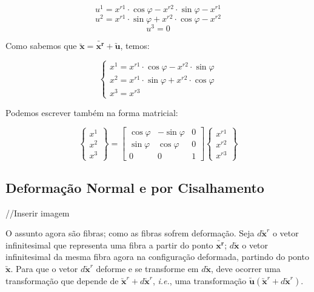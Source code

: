 \begin{enumerate}[a)]
			\[u^1=x^{r1}\cdot\cos\varphi-x^{r2}\cdot\sin\varphi-x^{r1}\]
			\[u^2=x^{r1}\cdot\sin\varphi+x^{r2}\cdot\cos\varphi-x^{r2}\]
			\[u^3=0\]
			
			Como sabemos que $\utilde{\mathbf{x}}=\utilde{\mathbf{x^r}}+\utilde{\mathbf{u}}$, temos:
			
			\[
				\begin{cases}
					x^1=x^{r1}\cdot\cos\varphi-x^{r2}\cdot\sin\varphi \\ x^2=x^{r1}\cdot\sin\varphi+x^{r2}\cdot\cos\varphi \\ x^3=x^{r3}
				\end{cases}
			\]
			
			Podemos escrever também na forma matricial:
			
			\[
				\begin{Bmatrix}
					x^1 \\ x^2 \\ x^3
				\end{Bmatrix}
				=
				\begin{bmatrix}
				
					\cos\varphi & -\sin\varphi & 0 \\
					\sin\varphi & \cos\varphi & 0 \\
					0 & 0 & 1
				\end{bmatrix}
				\begin{Bmatrix}
					x^{r1} \\ x^{r2} \\ x^{r3}
				\end{Bmatrix}							
			\]
	\end{enumerate}
		
	\subsection{Deformação Normal e por Cisalhamento}
	
	//Inserir imagem
	
	O assunto agora são fibras; como as fibras sofrem deformação. Seja $d\utilde{\mathbf{x}}^r$ o vetor infinitesimal que representa uma fibra a partir do ponto $\utilde{\mathbf{x^r}}$; $d\utilde{\mathbf{x}}$ o vetor infinitesimal da mesma fibra agora na configuração deformada, partindo do ponto $\utilde{\mathbf{x}}$.
	Para que o vetor $d\utilde{\mathbf{x}}^r$ deforme e se transforme em $d\utilde{\mathbf{x}}$, deve ocorrer uma transformação que depende de $\utilde{\mathbf{x}}^r+d\utilde{\mathbf{x}}^r$, \textit{i.e.}, uma transformação $\utilde{\mathbf{u}}(\utilde{\mathbf{x}}^r+d\utilde{\mathbf{x}}^r)$.
	
